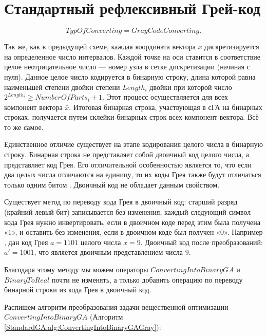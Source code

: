 \section{Стандартный рефлексивный Грей-код} \label{StandardGA:subsection_GrayCodeConverting}
\begin{equation}
\label{StandardGA:eq:GrayCodeConverting}
TypOfConverting =GrayCodeConverting.
\end{equation}

Так же, как в предыдущей схеме, каждая координата вектора $ \bar{x} $ дискретизируется на определенное число интервалов. Каждой точке на оси ставится в соответствие целое неотрицательное число --- номер узла в сетке дискретизации (начиная с нуля). Данное целое число кодируется в бинарную строку, длина которой равна наименьшей степени двойки степени $ Length_i $ двойки  при которой число $ 2^{Length_i}\geq NumberOfParts_i+1 $. Этот процесс осуществляется для всех компонент вектора $ \bar{x} $. Итоговая бинарная строка, участвующая в сГА на бинарных строках, получается путем склейки бинарных строк всех компонент вектора. Всё то же самое.

Единственное отличие существует на этапе кодирования целого числа в бинарную строку. Бинарная строка не представляет собой двоичный код целого числа, а представляет код Грея. Его отличительной особенностью является то, что если два целых числа отличаются на единицу, то их коды Грея также будут отличаться только одним битом \cite{web:GrayCode}. Двоичный код не обладает данным свойством.

Существует метод по переводу кода Грея в двоичный код: старший разряд (крайний левый бит) записывается без изменения, каждый следующий символ кода Грея нужно инвертировать, если в двоичном коде перед этим была получена «$ 1 $», и оставить без изменения, если в двоичном коде был получен «0». Например \cite{web:OptimalCoding}, дан код Грея $ a=1101 $ целого числа $ x=9 $. Двоичный код после преобразований: $ {a}'=1001 $, что является двоичным представлением числа $ 9 $.

Благодаря этому методу мы можем операторы $ ConvertingIntoBinaryGA $ и $ BinaryToReal $ почти не изменять, а только добавить операцию по переводу бинарной строки из кода Грея в двоичный код.

Распишем алгоритм преобразования задачи вещественной оптимизации $ ConvertingIntoBinaryGA $ (Алгоритм  \ref{StandardGA:alg:ConvertingIntoBinaryGAGray}):

